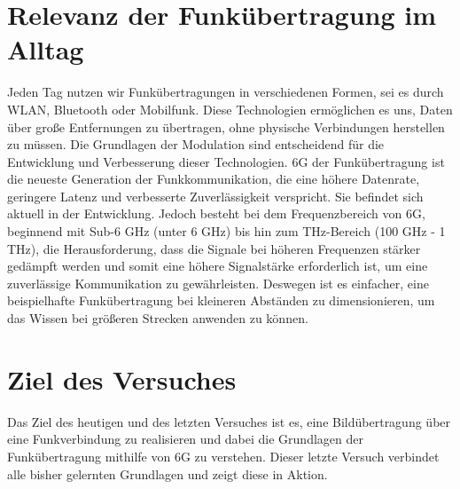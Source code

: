 \section{Relevanz der Funkübertragung im Alltag}
Jeden Tag nutzen wir Funkübertragungen in verschiedenen Formen, sei es durch WLAN, Bluetooth oder Mobilfunk. Diese Technologien ermöglichen es uns, Daten über große Entfernungen zu übertragen, ohne physische Verbindungen herstellen zu müssen. Die Grundlagen der Modulation sind entscheidend für die Entwicklung und Verbesserung dieser Technologien.
\ac{6G} der Funkübertragung ist die neueste Generation der Funkkommunikation, die eine höhere Datenrate, geringere Latenz und verbesserte Zuverlässigkeit verspricht. Sie befindet sich aktuell in der Entwicklung. 
Jedoch besteht bei dem Frequenzbereich von \ac{6G}, beginnend mit Sub-6 GHz (unter 6 GHz) bis hin zum THz-Bereich (100 GHz - 1 THz), 
die Herausforderung, dass die Signale bei höheren Frequenzen stärker gedämpft werden und somit eine höhere Signalstärke erforderlich ist, um eine zuverlässige Kommunikation zu gewährleisten.
Deswegen ist es einfacher, eine beispielhafte Funkübertragung bei kleineren Abständen zu dimensionieren, um das Wissen bei größeren Strecken anwenden zu können.
\section{Ziel des Versuches}
Das Ziel des heutigen und des letzten Versuches ist es, eine Bildübertragung über eine Funkverbindung zu realisieren und dabei die Grundlagen der Funkübertragung mithilfe von 6G zu verstehen.
Dieser letzte Versuch verbindet alle bisher gelernten Grundlagen und zeigt diese in Aktion.
\clearpage